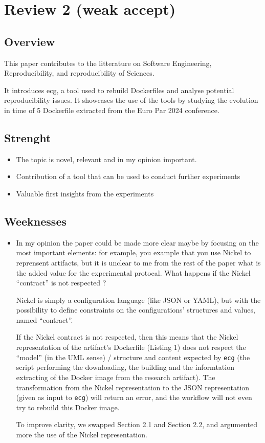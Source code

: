 \documentclass[%
	11pt,
	final,
]{article}
\begin{document}
\section{Review 2 (weak accept)}

\subsection{Overview}

This paper contributes to the litterature on Software Engineering, Reproducibility, and reproducibility of Sciences.

It introduces ecg, a tool used to rebuild Dockerfiles and analyse potential reproducibility issues.
It showcases the use of the tools by studying the evolution in time of 5 Dockerfile extracted from the Euro Par 2024 conference.

\subsection{Strenght}

\begin{itemize}
\item The topic is novel, relevant and in my opinion important. 
\item Contribution of a tool that can be used to conduct further experiments
\item Valuable first insights from the experiments
\end{itemize}

\subsection{Weeknesses}
 
\begin{itemize}
\item In my opinion the paper could be made more clear maybe by focusing on the most important elements: for example, you example that you use Nickel to reprensent artifacts, but it is unclear to me from the rest of the paper what is the added value for the experimental protocal. What happens if the Nickel ``contract'' is not respected ?
\begin{review-answer}
  Nickel is simply a configuration language (like JSON or YAML), but with the possibility to define constraints on the configurations' structures and values, named ``contract''.

  If the Nickel contract is not respected, then this means that the Nickel representation of the artifact's Dockerfile (Listing 1) does not respect the ``model'' (in the UML sense) / structure and content expected by \texttt{ecg} (the script performing the downloading, the building and the informtation extracting of the Docker image from the research artifact).
  The transformation from the Nickel representation to the JSON representation (given as input to \texttt{ecg}) will return an error, and the workflow will not even try to rebuild this Docker image.


  To improve clarity, we swapped Section 2.1 and Section 2.2, and argumented more the use of the Nickel representation.
\end{review-answer}
\end{itemize}
\end{document}
